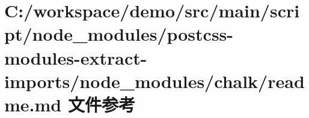 \hypertarget{node__modules_2postcss-modules-extract-imports_2node__modules_2chalk_2_r_e_a_d_m_e_8md}{}\section{C\+:/workspace/demo/src/main/script/node\+\_\+modules/postcss-\/modules-\/extract-\/imports/node\+\_\+modules/chalk/readme.md 文件参考}
\label{node__modules_2postcss-modules-extract-imports_2node__modules_2chalk_2_r_e_a_d_m_e_8md}
